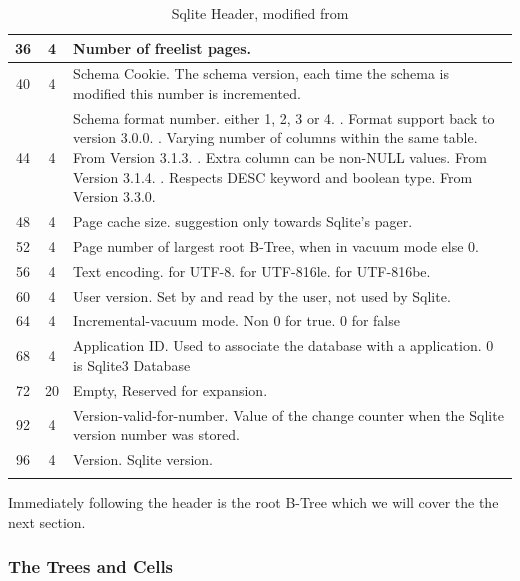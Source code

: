\begin{longtable}[h]{| c | c | p{10cm} |}
		\hline
			36 & 4 & Number of freelist pages. \\
		\hline
			40 & 4 & Schema Cookie. The schema version, each time the schema is modified this number is incremented. \\
		\hline
			44 & 4 & Schema format number. either 1, 2, 3 or 4. \newline
			1. Format support back to version 3.0.0. \newline
			2. Varying number of columns within the same table. From Version 3.1.3. \newline 
			3. Extra column can be non-NULL values. From Version 3.1.4. \newline
			4. Respects DESC keyword and boolean type. From Version 3.3.0. \newline \\
		\hline
			48 & 4 & Page cache size. suggestion only towards Sqlite's pager. \\
		\hline
			52 & 4 & Page number of largest root B-Tree, when in vacuum mode else 0. \\
		\hline
			56 & 4 & Text encoding. \newline
			 1 for UTF-8. \newline 
			 2 for UTF-816le. \newline 
			 3 for UTF-816be. \\
		\hline
			60 & 4 & User version. Set by and read by the user, not used by Sqlite. \\
		\hline
			64 & 4 & Incremental-vacuum mode. Non 0 for true. 0 for false \\
		\hline
			68 & 4 & Application ID. Used to associate the database with a application. 0 is Sqlite3 Database \\
		\hline
			72 & 20 & Empty, Reserved for expansion. \\
		\hline
			92 & 4 & Version-valid-for-number. Value of the change counter when the Sqlite version number was stored. \\
		\hline
			96 & 4 & Version. Sqlite version. \\
		\hline
	\caption{Sqlite Header, modified from \cite{sqlite}}
	\label{tbl:sqlite_header}
\end{longtable}

Immediately following the header is the root B-Tree which we will cover the the next section.

\subsubsection{The Trees and Cells}
\label{subsubsec:sqlite_trees_and_cells}

